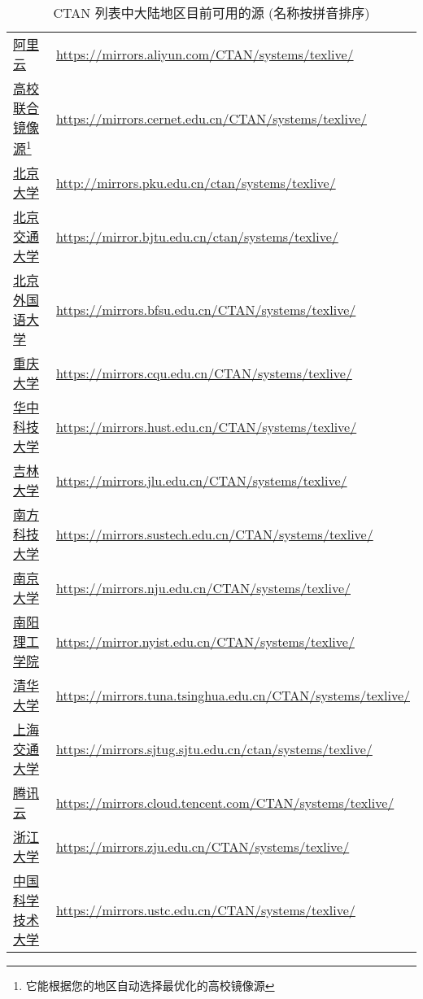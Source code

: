 \begin{table}
  \centering
  \caption{CTAN 列表中大陆地区目前可用的源 (名称按拼音排序)}\label{tab:appendix:mirror}
  \begin{tabular}{*{2}{l}}
    \hline\hline
    \href{https://developer.aliyun.com/mirror/}{阿里云}
    & \url{https://mirrors.aliyun.com/CTAN/systems/texlive/}\\
    \href{https://help.mirrors.cernet.edu.cn/CTAN/}{高校联合镜像源\footnote{它能根据您的地区自动选择最优化的高校镜像源}}
    & \url{https://mirrors.cernet.edu.cn/CTAN/systems/texlive/}\\
    \href{http://mirrors.pku.edu.cn/}{北京大学}
    & \url{http://mirrors.pku.edu.cn/ctan/systems/texlive/}\\
    \href{https://mirror.bjtu.edu.cn/}{北京交通大学}
    & \url{https://mirror.bjtu.edu.cn/ctan/systems/texlive/}\\
    \href{https://mirrors.bfsu.edu.cn/}{北京外国语大学}
    & \url{https://mirrors.bfsu.edu.cn/CTAN/systems/texlive/}\\
    \href{https://mirrors.cqu.edu.cn/}{重庆大学}
    & \url{https://mirrors.cqu.edu.cn/CTAN/systems/texlive/}\\
    \href{https://mirrors.hust.edu.cn/}{华中科技大学}
    & \url{https://mirrors.hust.edu.cn/CTAN/systems/texlive/}\\
    \href{https://mirrors.jlu.edu.cn/}{吉林大学}
    & \url{https://mirrors.jlu.edu.cn/CTAN/systems/texlive/}\\
    \href{https://mirrors.sustech.edu.cn/}{南方科技大学}
    & \url{https://mirrors.sustech.edu.cn/CTAN/systems/texlive/}\\
    \href{https://mirrors.nju.edu.cn/}{南京大学}
    & \url{https://mirrors.nju.edu.cn/CTAN/systems/texlive/}\\
    \href{https://mirror.nyist.edu.cn/}{南阳理工学院}
    & \url{https://mirror.nyist.edu.cn/CTAN/systems/texlive/}\\
    \href{https://mirrors.tuna.tsinghua.edu.cn/}{清华大学}
    & \url{https://mirrors.tuna.tsinghua.edu.cn/CTAN/systems/texlive/}\\
    \href{https://mirrors.sjtug.sjtu.edu.cn/}{上海交通大学}
    & \url{https://mirrors.sjtug.sjtu.edu.cn/ctan/systems/texlive/}\\
    \href{https://mirrors.cloud.tencent.com/}{腾讯云}
    & \url{https://mirrors.cloud.tencent.com/CTAN/systems/texlive/}\\
    \href{https://mirrors.zju.edu.cn/}{浙江大学}
    & \url{https://mirrors.zju.edu.cn/CTAN/systems/texlive/}\\
    \href{https://mirrors.ustc.edu.cn/}{中国科学技术大学}
    & \url{https://mirrors.ustc.edu.cn/CTAN/systems/texlive/}\\
    \hline\hline
  \end{tabular}
\end{table}

